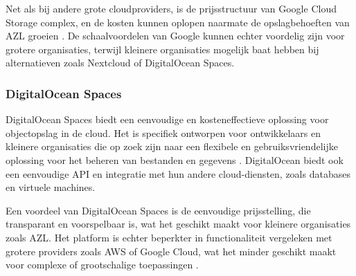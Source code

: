 Net als bij andere grote cloudproviders, is de prijsstructuur van Google Cloud Storage complex, en de kosten kunnen oplopen naarmate de opslagbehoeften van AZL groeien \autocite{google_pricing}. De schaalvoordelen van Google kunnen echter voordelig zijn voor grotere organisaties, terwijl kleinere organisaties mogelijk baat hebben bij alternatieven zoals Nextcloud of DigitalOcean Spaces.

\subsubsection{DigitalOcean Spaces}
DigitalOcean Spaces biedt een eenvoudige en kosteneffectieve oplossing voor objectopslag in de cloud. Het is specifiek ontworpen voor ontwikkelaars en kleinere organisaties die op zoek zijn naar een flexibele en gebruiksvriendelijke oplossing voor het beheren van bestanden en gegevens \autocite{digitalocean_spaces}. DigitalOcean biedt ook een eenvoudige API en integratie met hun andere cloud-diensten, zoals databases en virtuele machines.

Een voordeel van DigitalOcean Spaces is de eenvoudige prijsstelling, die transparant en voorspelbaar is, wat het geschikt maakt voor kleinere organisaties zoals AZL. Het platform is echter beperkter in functionaliteit vergeleken met grotere providers zoals AWS of Google Cloud, wat het minder geschikt maakt voor complexe of grootschalige toepassingen \autocite{digitalocean_pricing}.

